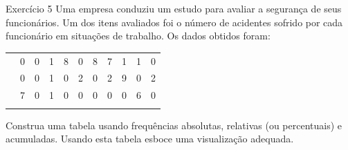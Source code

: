 \documentclass[
  ignorenonframetext,
  serif,
  professionalfont,
  usenames,
  dvipsnames,
  aspectratio = 169]{beamer}
\begin{document}
\begin{frame}{Exercício 5}
\label{exercuxedcio-5-1}
Uma empresa conduziu um estudo para avaliar a segurança de seus
funcionários. Um dos itens avaliados foi o número de acidentes sofrido
por cada funcionário em situações de trabalho. Os dados obtidos foram:

\begin{longtable}[]{@{}lllllllllll@{}}
\toprule\noalign{}
\endhead
& 0 & 0 & 1 & 8 & 0 & 8 & 7 & 1 & 1 & 0 \\
& 0 & 0 & 1 & 0 & 2 & 0 & 2 & 9 & 0 & 2 \\
& 7 & 0 & 1 & 0 & 0 & 0 & 0 & 0 & 6 & 0 \\
\bottomrule\noalign{}
\end{longtable}

Construa uma tabela usando frequências absolutas, relativas (ou
percentuais) e acumuladas. Usando esta tabela esboce uma visualização
adequada.
\end{frame}
\end{document}
